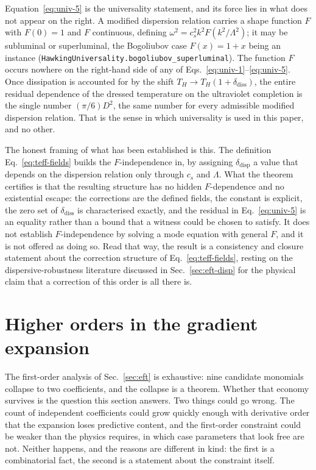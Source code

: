 \documentclass[aps,prd,reprint,nofootinbib,superscriptaddress]{revtex4-2}
\begin{document}
Equation~\eqref{eq:univ-5} is the universality statement, and its force
lies in what does not appear on the right. A modified dispersion relation
carries a shape function $F$ with $F(0)=1$ and $F$ continuous, defining
$\omega^{2} = c_s^{2}k^{2}F(k^{2}/\Lambda^{2})$; it may be subluminal or
superluminal, the Bogoliubov case $F(x) = 1+x$ being an instance
(\texttt{HawkingUniversality.bogoliubov\_superluminal}). The function $F$
occurs nowhere on the right-hand side of any of
Eqs.~\eqref{eq:univ-1}--\eqref{eq:univ-5}. Once dissipation is accounted
for by the shift $T_H \to T_H(1+\delta_{\mathrm{diss}})$, the entire
residual dependence of the dressed temperature on the ultraviolet
completion is the single number $(\pi/6)D^{2}$, the same number for every
admissible modified dispersion relation. That is the sense in which
universality is used in this paper, and no other.

The honest framing of what has been established is this. The definition
Eq.~\eqref{eq:teff-fields} builds the $F$-independence in, by assigning
$\delta_{\mathrm{disp}}$ a value that depends on the dispersion relation
only through $c_s$ and $\Lambda$. What the theorem certifies is that the
resulting structure has no hidden $F$-dependence and no existential
escape: the corrections are the defined fields, the constant is explicit,
the zero set of $\delta_{\mathrm{diss}}$ is characterised exactly, and
the residual in Eq.~\eqref{eq:univ-5} is an equality rather than a bound
that a witness could be chosen to satisfy. It does not establish
$F$-independence by solving a mode equation with general $F$, and it is
not offered as doing so. Read that way, the result is a consistency and
closure statement about the correction structure of
Eq.~\eqref{eq:teff-fields}, resting on the dispersive-robustness
literature discussed in Sec.~\ref{sec:eft-disp} for the physical claim
that a correction of this order is all there is.

\section{Higher orders in the gradient expansion}
\label{sec:higher}

The first-order analysis of Sec.~\ref{sec:eft} is exhaustive: nine
candidate monomials collapse to two coefficients, and the collapse is a
theorem. Whether that economy survives is the question this section
answers. Two things could go wrong. The count of independent
coefficients could grow quickly enough with derivative order that the
expansion loses predictive content, and the first-order constraint could
be weaker than the physics requires, in which case parameters that look
free are not. Neither happens, and the reasons are different in kind:
the first is a combinatorial fact, the second is a statement about the
constraint itself.
\end{document}
